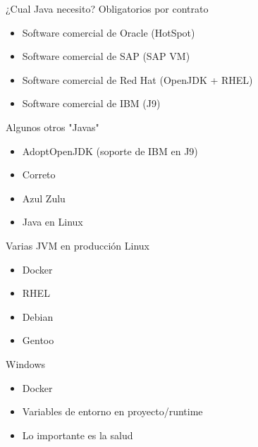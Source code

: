 \documentclass[aspectratio=169]{beamer}
\begin{document}
\begin{frame}[fragile]{¿Cual Java necesito?}
    Obligatorios por contrato
    \begin{itemize}
        \item Software comercial de Oracle (HotSpot)
        \item Software comercial de SAP (SAP VM)
        \item Software comercial de Red Hat (OpenJDK + RHEL)
        \item Software comercial de IBM (J9)
    \end{itemize}
    Algunos otros "Javas"
\begin{itemize}
    \item AdoptOpenJDK (soporte de IBM en J9)
    \item Correto
    \item Azul Zulu
    \item Java en Linux
\end{itemize}
\end{frame}

\begin{frame}[fragile]{Varias JVM en producción}
    Linux
    \begin{itemize}
        \item Docker
        \item RHEL
        \item Debian
        \item Gentoo
    \end{itemize}
    Windows
    \begin{itemize}
        \item Docker
        \item Variables de entorno en proyecto/runtime
        \item Lo importante es la salud
    \end{itemize}
\end{frame}
\end{document}
